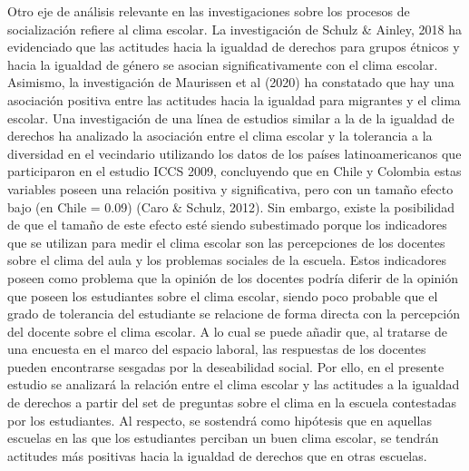 \documentclass[12pt,twoside]{templates/facsothesis}
\begin{document}
Otro eje de análisis relevante en las investigaciones sobre los procesos de socialización refiere al clima escolar. La investigación de Schulz \& Ainley, 2018 ha evidenciado que las actitudes hacia la igualdad de derechos para grupos étnicos y hacia la igualdad de género se asocian significativamente con el clima escolar. Asimismo, la investigación de Maurissen et al (2020) ha constatado que hay una asociación positiva entre las actitudes hacia la igualdad para migrantes y el clima escolar. Una investigación de una línea de estudios similar a la de la igualdad de derechos ha analizado la asociación entre el clima escolar y la tolerancia a la diversidad en el vecindario utilizando los datos de los países latinoamericanos que participaron en el estudio ICCS 2009, concluyendo que en Chile y Colombia estas variables poseen una relación positiva y significativa, pero con un tamaño efecto bajo (en Chile = 0.09) (Caro \& Schulz, 2012). Sin embargo, existe la posibilidad de que el tamaño de este efecto esté siendo subestimado porque los indicadores que se utilizan para medir el clima escolar son las percepciones de los docentes sobre el clima del aula y los problemas sociales de la escuela. Estos indicadores poseen como problema que la opinión de los docentes podría diferir de la opinión que poseen los estudiantes sobre el clima escolar, siendo poco probable que el grado de tolerancia del estudiante se relacione de forma directa con la percepción del docente sobre el clima escolar. A lo cual se puede añadir que, al tratarse de una encuesta en el marco del espacio laboral, las respuestas de los docentes pueden encontrarse sesgadas por la deseabilidad social. Por ello, en el presente estudio se analizará la relación entre el clima escolar y las actitudes a la igualdad de derechos a partir del set de preguntas sobre el clima en la escuela contestadas por los estudiantes. Al respecto, se sostendrá como hipótesis que en aquellas escuelas en las que los estudiantes perciban un buen clima escolar, se tendrán actitudes más positivas hacia la igualdad de derechos que en otras escuelas.
\end{document}
